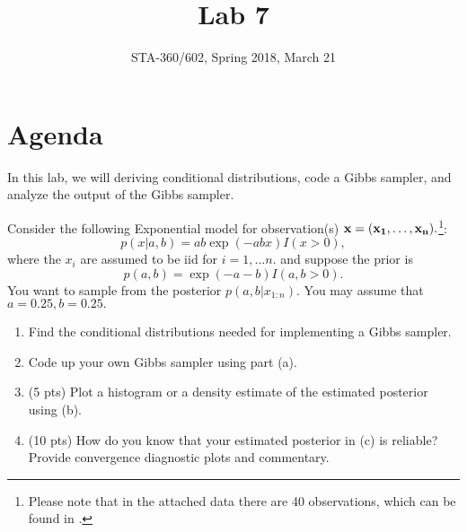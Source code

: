 \documentclass{article}
\begin{document}
\title{Lab 7}
\author{STA-360/602, Spring 2018, March 21}
\maketitle

\section{Agenda}

In this lab, we will deriving conditional distributions, code a Gibbs sampler, and analyze the output of the Gibbs sampler. 

Consider the following Exponential model for observation(s) $\bf{x}=(x_1,\ldots,x_n).$\footnote{Please note that in the attached data there are 40 observations, which can be found in .}:
$$ p(x|a,b) = a b \exp(- a b x) I(x>0),$$ where the $x_i$ are assumed to be iid for $i=1,\ldots n.$
and suppose the prior is 
$$ p(a,b) = \exp(- a - b)I(a,b>0). $$
You want to sample from the posterior $p(a,b|x_{1:n})$.  You may assume that $a=0.25, b=0.25.$

\begin{enumerate}
\item Find the conditional distributions needed for implementing a Gibbs sampler.
\item Code up your own Gibbs sampler using part (a).
\item (5 pts) Plot a histogram or a density estimate of the estimated posterior using (b). 
\item (10 pts) How do you know that your estimated posterior in (c) is reliable? Provide convergence diagnostic plots and commentary. 
\end{enumerate}
\end{document}
